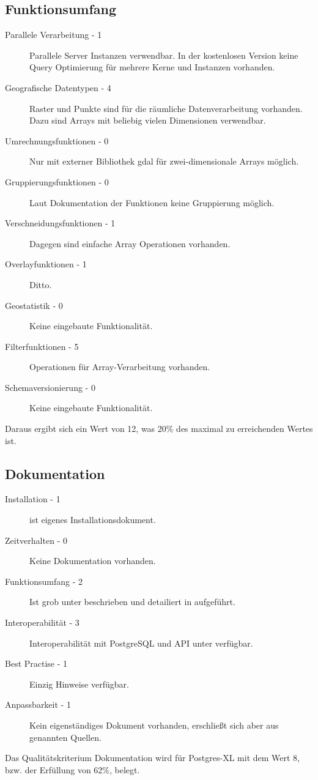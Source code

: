 \subsection{Funktionsumfang}
\begin{description}
\item[Parallele Verarbeitung - 1] Parallele Server Instanzen verwendbar. In der kostenlosen Version keine Query Optimierung für mehrere Kerne und Instanzen vorhanden. \cite{website:rasdaman-features}
\item[Geografische Datentypen - 4] Raster und Punkte sind für die räumliche Datenverarbeitung vorhanden. Dazu sind Arrays mit beliebig vielen Dimensionen verwendbar. \cite{website:rasdaman-introduction}
\item[Umrechnungsfunktionen - 0] Nur mit externer Bibliothek \Gls{gdal} für zwei-dimensionale Arrays möglich. \cite{website:rasdaman-gdal}
\item[Gruppierungsfunktionen - 0] Laut Dokumentation der Funktionen keine Gruppierung möglich. \cite{website:rasdaman-querymanual}
\item[Verschneidungsfunktionen - 1] Dagegen sind einfache Array Operationen vorhanden.
\item[Overlayfunktionen - 1] Ditto.
\item[Geostatistik - 0] Keine eingebaute Funktionalität.
\item[Filterfunktionen - 5] Operationen für Array-Verarbeitung vorhanden.
\item[Schemaversionierung - 0] Keine eingebaute Funktionalität.
\end{description}
Daraus ergibt sich ein Wert von 12, was 20\% des maximal zu erreichenden Wertes ist.

\subsection{Dokumentation}
\begin{description}
\item[Installation - 1] \cite{website:rasdaman-dokumentation} ist eigenes Installationsdokument.
\item[Zeitverhalten - 0] Keine Dokumentation vorhanden.
\item[Funktionsumfang - 2] Ist grob unter \cite{website:rasdaman-features} beschrieben und detailiert in \cite{website:rasdaman-querymanual} aufgeführt.
\item[Interoperabilität - 3] Interoperabilität mit PostgreSQL und API unter \cite{website:rasdaman-querymanual} verfügbar.
\item[Best Practise - 1] Einzig Hinweise verfügbar. \cite{website:rasdaman-installationguide}
\item[Anpassbarkeit - 1] Kein eigenständiges Dokument vorhanden, erschließt sich aber aus genannten Quellen.
\end{description}
Das Qualitätskriterium Dokumentation wird für Postgres-XL mit dem Wert 8, bzw. der Erfüllung von 62\%, belegt.

